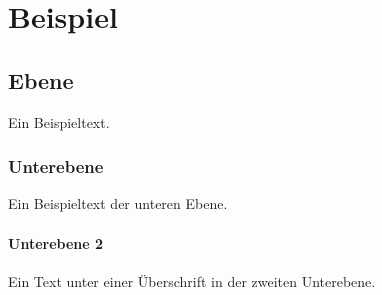 \chapter{Beispiel}

\section{Ebene}

Ein Beispieltext.

\subsection{Unterebene}

Ein Beispieltext der unteren Ebene.

\subsubsection{Unterebene 2}

Ein Text unter einer Überschrift in der zweiten Unterebene.